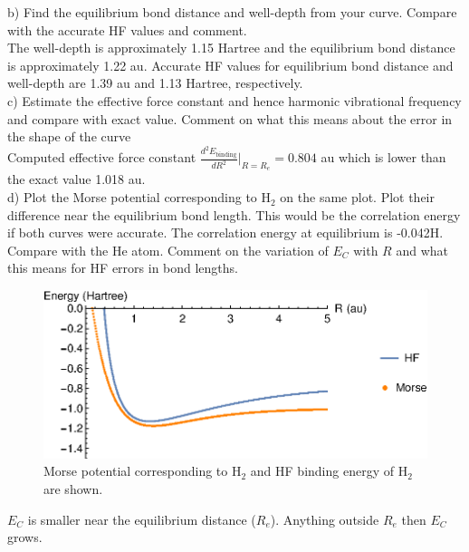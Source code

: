 \documentclass{article}
\begin{document}
\noindent b) Find the equilibrium bond distance and well-depth from your curve.
Compare with the accurate HF values and comment.
\\

{\color{blue}
    The well-depth is approximately 1.15 Hartree and the equilibrium bond
    distance is approximately 1.22 au. Accurate HF values for equilibrium
bond distance and well-depth are 1.39 au and 1.13 Hartree, respectively.}
\\
  
\noindent c) Estimate the effective force constant and hence harmonic vibrational
frequency and compare with exact value. Comment on what this means about the error
in the shape of the curve
\\

{\color{blue}
  Computed effective force constant $\frac{d^2E_{\text{binding}}}{dR^2}\bigg|_{R=R_e}=0.804$
  au which is lower than the exact value 1.018 au.
}
\\

\noindent d) Plot the Morse potential corresponding to H$_2$ on the same plot. Plot
their difference near the equilibrium bond length. This would be the correlation
energy if both curves were accurate. The correlation energy at equilibrium is -0.042H.
Compare with the He atom. Comment on the variation of $E_C$ with $R$ and what this
means for HF errors in bond lengths.
\\

\begin{figure}[H]
  \centering
  \includegraphics[scale=1]{hf_morse_comp.eps}
  \caption{Morse potential corresponding to H$_2$ and HF binding energy
  of H$_2$ are shown.}
\end{figure}

{\color{blue}
  $E_C$ is smaller near the equilibrium distance ($R_e$). Anything outside $R_e$
  then $E_C$ grows.
}
\end{document}
